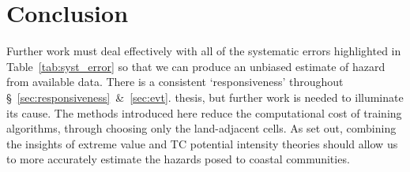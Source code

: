 \section{Conclusion}
\label{sec:8_Conclusion}


Further work must deal effectively with all of the systematic errors
highlighted in Table~\ref{tab:syst_error} so that we can produce
an unbiased estimate of hazard from available data.
There is a consistent `responsiveness' throughout
§~\ref{sec:responsiveness}~\&~\ref{sec:evt}.
thesis, but further work is needed to illuminate its cause.
The methods introduced here reduce the computational cost
of training algorithms, through choosing only the
land-adjacent cells.
As set out, combining the insights of
extreme value and TC potential intensity theories should allow
us to more accurately estimate the hazards posed to coastal communities.
